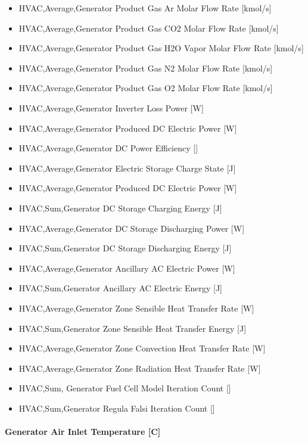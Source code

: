 \begin{itemize}
\item
  HVAC,Average,Generator Product Gas Ar Molar Flow Rate {[}kmol/s{]}
\item
  HVAC,Average,Generator Product Gas CO2 Molar Flow Rate {[}kmol/s{]}
\item
  HVAC,Average,Generator Product Gas H2O Vapor Molar Flow Rate {[}kmol/s{]}
\item
  HVAC,Average,Generator Product Gas N2 Molar Flow Rate {[}kmol/s{]}
\item
  HVAC,Average,Generator Product Gas O2 Molar Flow Rate {[}kmol/s{]}
\item
  HVAC,Average,Generator Inverter Loss Power {[}W{]}
\item
  HVAC,Average,Generator Produced DC Electric Power {[}W{]}
\item
  HVAC,Average,Generator DC Power Efficiency {[]}
\item
  HVAC,Average,Generator Electric Storage Charge State {[}J{]}
\item
  HVAC,Average,Generator Produced DC Electric Power {[}W{]}
\item
  HVAC,Sum,Generator DC Storage Charging Energy {[}J{]}
\item
  HVAC,Average,Generator DC Storage Discharging Power {[}W{]}
\item
  HVAC,Sum,Generator DC Storage Discharging Energy {[}J{]}
\item
  HVAC,Average,Generator Ancillary AC Electric Power {[}W{]}
\item
  HVAC,Sum,Generator Ancillary AC Electric Energy {[}J{]}
\item
  HVAC,Average,Generator Zone Sensible Heat Transfer Rate {[}W{]}
\item
  HVAC,Sum,Generator Zone Sensible Heat Transfer Energy {[}J{]}
\item
  HVAC,Average,Generator Zone Convection Heat Transfer Rate {[}W{]}
\item
  HVAC,Average,Generator Zone Radiation Heat Transfer Rate {[}W{]}
\item
  HVAC,Sum, Generator Fuel Cell Model Iteration Count {[]}
\item
  HVAC,Sum,Generator Regula Falsi Iteration Count {[]}
\end{itemize}

\paragraph{Generator Air Inlet Temperature {[}C{]}}\label{generator-air-inlet-temperature-c}

